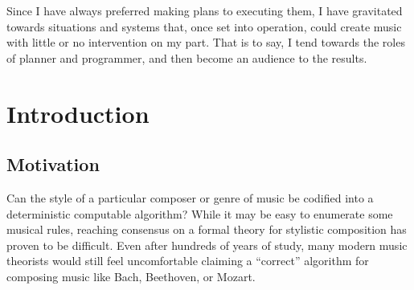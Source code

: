 

\begin{savequote}[75mm]
  Since I have always preferred making plans to executing them, I have
  gravitated towards situations and systems that, once set into operation,
  could create music with little or no intervention on my part. That is to say,
  I tend towards the roles of planner and programmer, and then become an
  audience to the results.
\end{savequote}

\chapter{Introduction}\label{ch:intro}

\ifpdf
    \graphicspath{{Chapter1/Figs/Raster/}{Chapter1/Figs/PDF/}{Chapter1/Figs/}}
\else
    \graphicspath{{Chapter1/Figs/Vector/}{Chapter1/Figs/}}
\fi

\section{Motivation}

Can the style of a particular composer or genre of music be codified into a
deterministic computable algorithm? While it may be easy to enumerate some
musical rules, reaching consensus on a formal theory for
stylistic composition has proven to be difficult. Even after hundreds of years
of study, many modern music theorists would still feel uncomfortable claiming a
``correct'' algorithm for composing music like Bach, Beethoven, or Mozart.

